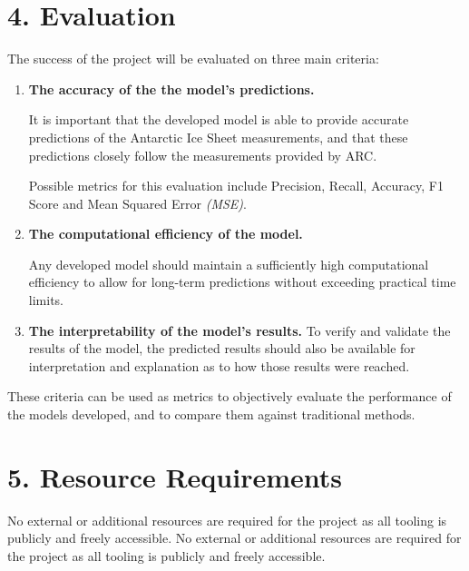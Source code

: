 \documentclass[11pt, a4paper, twoside, openright]{report}
\begin{document}
\section*{4. Evaluation}

The success of the project will be evaluated on three main
criteria:
\begin{enumerate}
\item \textbf{The accuracy of the the model's predictions.}
  
  It is important that the developed model is able to
  provide accurate predictions of the Antarctic Ice Sheet
  measurements, and that these predictions closely follow
  the measurements provided by ARC.
  
  Possible metrics for
  this evaluation include Precision, Recall, Accuracy,
  F1 Score and Mean Squared Error \textit{(MSE)}.
\item \textbf{The computational efficiency of the model.}

  Any developed model should maintain a sufficiently high
  computational efficiency to allow for long-term predictions
  without exceeding practical time limits.
\item \textbf{The interpretability of the model's results.}
  To verify and validate the results of the model, the 
  predicted results should also be available for 
  interpretation and explanation as to how those results
  were reached.
\end{enumerate}
These criteria can be used as metrics to objectively
evaluate the performance of the models developed, and
to compare them against traditional methods.

\section*{5. Resource Requirements}

No external or additional resources are required for the
project as all tooling is publicly and freely accessible.
No external or additional resources are required for the
project as all tooling is publicly and freely accessible.

\backmatter



\end{document}
